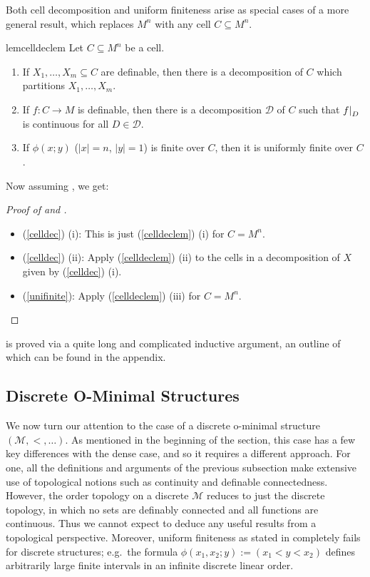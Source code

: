 \documentclass[a4paper]{report}
\newcommand{\ind}{\hspace{15pt}}
\newcommand{\D}{\mathcal{D}}
\newcommand{\M}{\mathcal{M}}
\newcommand\restr[2]{{\left.\kern-\nulldelimiterspace#1\right|_{#2}}}
\theoremstyle{definition}
\theoremstyle{remstyle}
\begin{document}
\ind Both cell decomposition and uniform finiteness arise as special cases of a more general result, which replaces $M^n$ with any cell $C\subseteq M^n$.

\begin{restatable}[]{lem}{celldeclem}\label{celldeclem}
	Let $C\subseteq M^n$ be a cell.
	\begin{enumerate}
		\item If $X_1,\ldots,X_m\subseteq C$ are definable, then there is a decomposition of $C$ which partitions $X_1,\ldots,X_m$.
		\item If $f:C\to M$ is definable, then there is a decomposition $\D$ of $C$ such that $\restr{f}{D}$ is continuous for all $D\in\D$.
		\item If $\phi(x;y)$ ($|x|=n$, $|y|=1$) is finite over $C$, then it is uniformly finite over $C$.
	\end{enumerate}
\end{restatable}

\ind Now assuming , we get:

\begin{proof}[Proof of  and ]\
	\begin{itemize}
		\item (\ref{celldec}) (i): This is just (\ref{celldeclem}) (i) for $C=M^n$.
		\item (\ref{celldec}) (ii): Apply (\ref{celldeclem}) (ii) to the cells in a decomposition of $X$ given by (\ref{celldec}) (i).
		\item (\ref{unifinite}): Apply (\ref{celldeclem}) (iii) for $C=M^n$.
	\end{itemize}
\end{proof}

\ind {} is proved via a quite long and complicated inductive argument, an outline of which can be found in the appendix.

\subsection{Discrete O-Minimal Structures}

\ind We now turn our attention to the case of a discrete o-minimal structure $(\M,<,\ldots)$. As mentioned in the beginning of the section, this case has a few key differences with the dense case, and so it requires a different approach. For one, all the definitions and arguments of the previous subsection make extensive use of topological notions such as continuity and definable connectedness. However, the order topology on a discrete $\M$ reduces to just the discrete topology, in which no sets are definably connected and all functions are continuous. Thus we cannot expect to deduce any useful results from a topological perspective. Moreover, uniform finiteness as stated in  completely fails for discrete structures; e.g.\ the formula $\phi(x_1,x_2;y):=(x_1<y<x_2)$ defines arbitrarily large finite intervals in an infinite discrete linear order.
\end{document}
